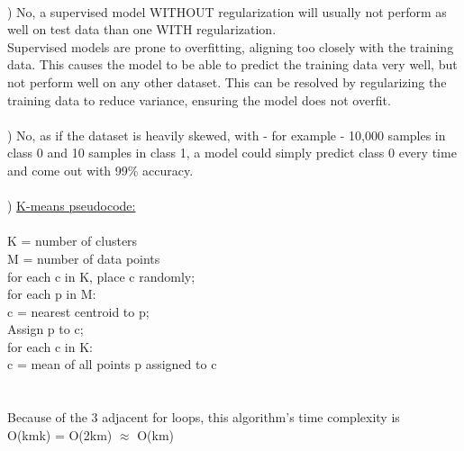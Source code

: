 \documentclass[12pt]{article}
\begin{document}
\noindent \hrulefill \\



) No, a supervised model WITHOUT regularization will usually not perform as well on test data than one WITH regularization.\\
\indent Supervised models are prone to overfitting, aligning too closely with the training data. This causes the model to be able to predict the training data very well, but not perform well on any other dataset. This can be resolved by regularizing the training data to reduce variance, ensuring the model does not overfit.\\[-.8em]



\noindent \hrulefill \\



) No, as if the dataset is heavily skewed, with - for example - 10,000 samples in class 0 and 10 samples in class 1, a model could simply predict class 0 every time and come out with 99\% accuracy.\\[-.8em]



\noindent \hrulefill \\



) \underline{K-means pseudocode:} \\\\
\indent K = number of clusters\\
\indent M = number of data points\\

for each c in K, place c randomly;\\

\indent for each p in M:\\
\indent \indent c = nearest centroid to p;\\
\indent \indent Assign p to c;\\

for each c in K:\\
\indent \indent c = mean of all points p assigned to c\\\\\\


Because of the 3 adjacent for loops, this algorithm's time complexity is \\[.4em]
\indent O(kmk) = O(2km) $\approx$ O(km)\\




\end{document}
